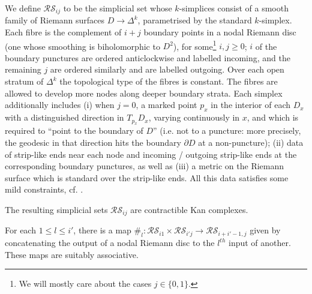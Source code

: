 \documentclass{TPmod}
\newcommand{\cR}{\mathcal{R}}
\newcommand{\cS}{\mathcal{S}}
\numberwithin{equation}{section}
\begin{document}
    \begin{defn}\label{def: RSij}
        We define $\cR\cS_{ij}$ to be the simplicial set whose $k$-simplices consist of a smooth family of Riemann surfaces $D \to \Delta^k$, parametrised by the standard $k$-simplex. Each fibre is the complement of $i+j$ boundary points in a nodal Riemann disc (one whose smoothing is biholomorphic to $D^2$), for some\footnote{We will mostly care about the cases $j\in \{0,1\}$.} $i, j\geq 0$; $i$ of the boundary punctures are ordered anticlockwise and labelled incoming, and the remaining $j$ are ordered similarly and are labelled outgoing. Over each open stratum of $\Delta^k$ the topological type of the fibres is constant. The fibres are allowed to develop more nodes along deeper boundary strata.  Each simplex additionally includes (i) when $j=0$,  a marked point $p_x$ in the interior of each $D_x$ with a distinguished direction in $T_{p_x} D_x$, varying continuously in $x$, and which is required to ``point to the boundary of $D$'' (i.e. not to a puncture: more precisely, the geodesic in that direction hits the boundary $\partial D$ at a non-puncture); (ii) data of strip-like ends near each node and incoming / outgoing strip-like ends at the corresponding boundary punctures, as well as (iii) a metric on the Riemann surface which is standard over the strip-like ends. All this data  satisfies some mild constraints, cf. \cite[Sections 3.2-3.3]{PS2}.
    \end{defn}
    

    \begin{lem}
        The resulting simplicial sets $\cR\cS_{ij}$ are contractible Kan complexes.
    \end{lem}
    For each $1 \leq l \leq i'$, there is a map $\#_l: \cR\cS_{i1} \times \cR\cS_{i'j} \to \cR\cS_{i+i'-1,j}$ given by concatenating the output of a nodal Riemann disc to the $l^{th}$ input of another. These maps are suitably associative.
\end{document}
